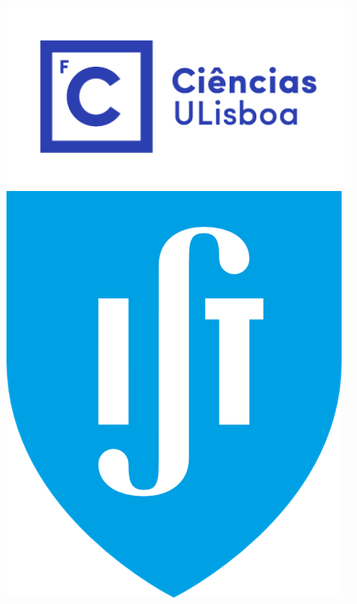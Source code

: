 \begin{figure}[ht]
\begin{minipage}[b]{0.06\linewidth}
        \end{minipage}
        \hfill
        \begin{minipage}[b]{0.06\linewidth}
            \includegraphics[width=\linewidth]{images/fcul.png}
        \end{minipage}
        \hfill
        \begin{minipage}[b]{0.06\linewidth}
            \includegraphics[width=\linewidth]{images/ist.png}
        \end{minipage}

\end{figure}
